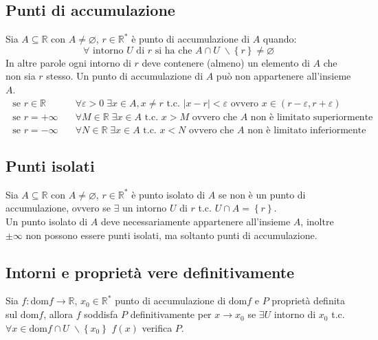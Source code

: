 \documentclass[a4paper]{article}
\newcommand\dom{\text{dom}}
\begin{document}
\subsection{Punti di accumulazione}
Sia \(A \subseteq \mathbb{R}\) con \(A \neq \varnothing\), \(r \in \mathbb{R}^*\) è punto di accumulazione di \(A\) quando:
\[\forall \text{ intorno } U \text{ di } r \text{ si ha che } A \cap U \; \backslash \left\{ r \right\} \neq \varnothing\]
In altre parole ogni intorno di \(r\) deve contenere (almeno) un elemento di \(A\) che non sia \(r\) stesso. Un punto di accumulazione di \(A\) può non appartenere all'insieme \(A\).
\begin{align*}
	\text{ se } r \in \mathbb{R} \quad & \forall \varepsilon > 0 \; \exists x \in A, x \neq r \text{ t.c. } \left| x - r \right| < \varepsilon \text{ ovvero } x \in \left( r - \varepsilon, r + \varepsilon \right) \\
	\text{ se } r = + \infty \quad & \forall M \in \mathbb{R} \; \exists x \in A \text{ t.c. } x > M \text{ ovvero che } A \text{ non è limitato superiormente } \\
	\text{ se } r = - \infty \quad & \forall N \in \mathbb{R} \; \exists x \in A \text{ t.c. } x < N \text{ ovvero che } A \text{ non è limitato inferiormente }
\end{align*}


\subsection{Punti isolati}
Sia \(A \subseteq \mathbb{R}\) con \(A \neq \varnothing\), \(r \in \mathbb{R}^*\) è punto isolato di \(A\) se non è un punto di accumulazione,
ovvero se \(\exists\) un intorno \(U\) di \(r\) t.c. \(U \cap A = \left\{ r \right\}\). \\
Un punto isolato di \(A\) deve necessariamente appartenere all'insieme \(A\), inoltre \(\pm \infty\) non possono essere punti isolati, ma soltanto punti di accumulazione.

\newpage


\subsection{Intorni e proprietà vere definitivamente}
Sia \(f: \dom f \to \mathbb{R}\), \(x_0 \in \mathbb{R}^*\) punto di accumulazione di \(\dom f\) e \(P\) proprietà definita sul \(\dom f\),
allora \(f\) soddisfa \(P\) definitivamente per \(x \to x_0\) se \(\exists U\) intorno di \(x_0\) t.c. \(\forall x \in \dom f \cap U \; \backslash \left\{ x_0 \right\}\) \(f(x)\) verifica \(P\).
\end{document}
